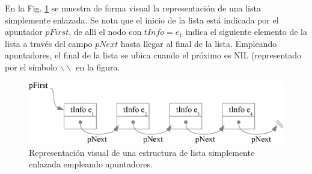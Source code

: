 En la Fig. \ref{fig:listas} se muestra de forma visual la representación de una lista simplemente enlazada. Se nota que el inicio de la lista está indicada por el apuntador $pFirst$, de allí el nodo con $tInfo = e_1$ indica el siguiente elemento de la lista a través del campo $pNext$ hasta llegar al final de la lista. Empleando apuntadores, el final de la lista se ubica cuando el próximo es NIL (representado por el símbolo $\backslash \backslash$ en la figura.

\begin{figure}[!htpb]
\centering
\includegraphics[scale=.7]{images/listas.eps}
\caption{Representación visual de una estructura de lista simplemente enlazada empleando apuntadores.}
\label{fig:listas}
\end{figure}

